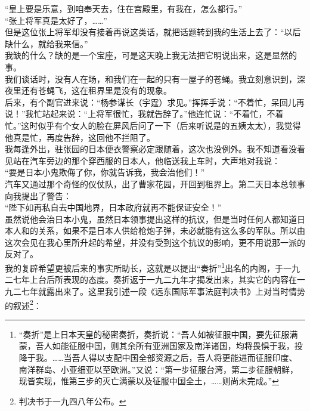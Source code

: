 “皇上要是乐意，到咱奉天去，住在宫殿里，有我在，怎么都行。”\\

“张上将军真是太好了，……”\\

但是这位张上将军却没有接着再说这类话，就把话题转到我的生活上去了：“以后缺什么，就给我来信。”\\

我缺的什么？缺的是一个宝座，可是这天晚上我无法把它明说出来，这是显然的事。\\

我们谈话时，没有人在场，和我们在一起的只有一屋子的苍蝇。我立刻意识到，深夜里还有苍蝇飞，这在租界里是没有的现象。\\

后来，有个副官进来说：“杨参谋长（宇霆）求见。”挥挥手说：“不着忙，呆回儿再说！”我忙站起来说：“上将军很忙，我就告辞了。”他连忙说：“不着忙，不着忙。”这时似乎有个女人的脸在屏风后问了一下（后来听说是的五姨太太），我觉得他真是忙，再度告辞，这回他不拦阻了。\\

我每逢外出，驻张园的日本便衣警察必定跟随着，这次也没例外。我不知道看没看见站在汽车旁边的那个穿西服的日本人，他临送我上车时，大声地对我说：\\

“要是日本小鬼欺侮了你，你就告诉我，我会治他们！”\\

汽车又通过那个奇怪的仪仗队，出了曹家花园，开回到租界上。第二天日本总领事向我提出了警告：\\

“陛下如再私自去中国地界，日本政府就再不能保证安全！”\\

虽然说他会治日本小鬼，虽然日本领事提出这样的抗议，但是当时任何人都知道日本人和的关系，如果不是日本人供给枪炮子弹，未必就能有这么多的军队。所以由这次会见在我心里所升起的希望，并没有受到这个抗议的影响，更不用说那一派的反对了。\\

我的复辟希望更被后来的事实所助长，这就是以提出“奏折”\footnote{“奏折”是上日本天皇的秘密奏折，奏折说：“吾人如被征服中国，要先征服满蒙，吾人如能征服中国，则其余所有亚洲国家及南洋诸国，均将畏惧于我，投降于我。……当吾人得以支配中国全部资源之后，吾人将更能进而征服印度、南洋群岛、小亚细亚以至欧洲。”又说：“第一步征服台湾，第二步征服朝鲜，现皆实现，惟第三步的灭亡满蒙以及征服中国全土，……则尚未完成。”
}出名的内阁，于一九二七年上台后所表现的态度。奏折返于一九二九年才揭发出来，其实它的内容在一九二七年就露出来了。这里我引述一段《远东国际军事法庭判决书》上对当时情势的叙述\footnote{判决书于一九四八年公布。}：\\

